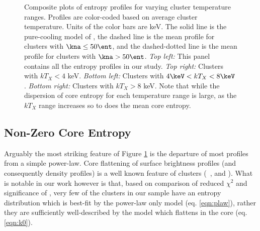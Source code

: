 \begin{center}
\begin{figure}[htp]
\begin{minipage}[htp]{0.5\linewidth}
    \end{minipage}
    \caption[Composite plots of entropy profiles for varying cluster
      temperature ranges.]{Composite plots of entropy profiles for varying cluster
      temperature ranges. Profiles are color-coded based on average
      cluster temperature. Units of the color bars are keV. The solid
      line is the pure-cooling model of \cite{voitbryan}, the dashed
      line is the mean profile for clusters with $\kna \le 50 \ent$,
      and the dashed-dotted line is the mean profile for clusters with
      $\kna > 50 \ent$. {\it{Top left:}} This panel contains all the
      entropy profiles in our study. {\it{Top right:}} Clusters with
      $kT_X < 4$ keV. {\it{Bottom left:}} Clusters with $4\keV < kT_X
      < 8\keV$. {\it{Bottom right:}} Clusters with $kT_X > 8$
      keV. Note that while the dispersion of core entropy for each
      temperature range is large, as the $kT_X$ range increases so to
      does the mean core entropy.}
    \label{fig:splots}
  \end{figure}
\end{center}

\subsection{Non-Zero Core Entropy}
\label{sec:entsuppnonzerok0}

Arguably the most striking feature of Figure \ref{fig:splots} is the
departure of most profiles from a simple power-law. Core flattening of
surface brightness profiles (and consequently density profiles) is a
well known feature of clusters (\eg\ \citealt{1984ApJ...276...38J},
\citealt{1999ApJ...517..627M} and \citealt{2000MNRAS.318..715X}). What
is notable in our work however is that, based on comparison of reduced
$\chi^2$ and significance of \kna, very few of the clusters in our
sample have an entropy distribution which is best-fit by the power-law
only model (eq. \ref{eqn:plaw}), rather they are sufficiently
well-described by the model which flattens in the core
(eq. \ref{eqn:k0}).

